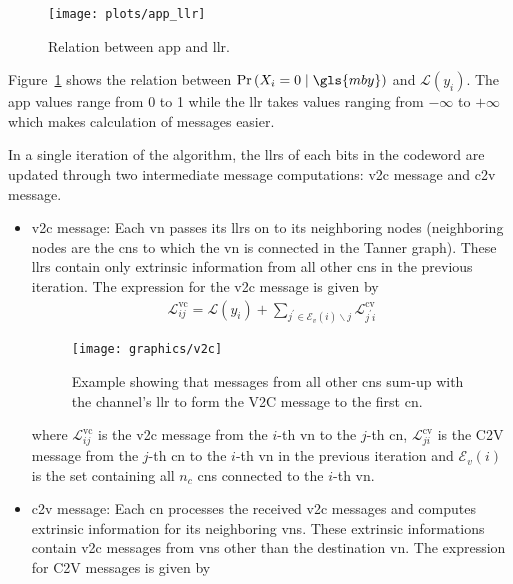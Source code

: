 \begin{figure}[htbp]
  \centering
  \texttt{[image: plots/app\_llr]}
  \caption{Relation between \gls{app} and \gls{llr}.}
  \label{fig:app_llr}
\end{figure}

Figure~\ref{fig:app_llr} shows the relation between $\prob\left(X_i=0\mid\gls{mby}\right)$ and $\mathcal{L}(y_i)$. The \gls{app} values range from 0 to 1 while the \gls{llr} takes values ranging from $-\infty$ to $+\infty$ which makes calculation of messages easier.

In a single iteration of the algorithm, the \glspl{llr} of each bits in the codeword are updated through two intermediate message computations: \gls{v2c} message and \gls{c2v} message.
\begin{itemize}
  \item \gls{v2c} message: Each \gls{vn} passes its \glspl{llr} on to its neighboring nodes (neighboring nodes are the \glspl{cn} to which the \gls{vn} is connected in the Tanner graph). These \glspl{llr} contain only extrinsic information from all other \glspl{cn} in the previous iteration. The expression for the \gls{v2c} message is given by~\cite{Hagenauer1996}
  \begin{align}
    \mathcal{L}^{\mathrm{vc}}_{ij}=\mathcal{L}(y_i)+\sum_{j^\prime\in\mathcal{E}_v(i)\backslash j} \mathcal{L}^{\mathrm{cv}}_{j^\prime i}
  \end{align}
  \begin{figure}[htbp]
    \centering
    \texttt{[image: graphics/v2c]}
    \caption{Example showing that messages from all other \glspl{cn} sum-up with the channel's \gls{llr} to form the V2C message to the first \gls{cn}.}
    \label{fig:v2c}
  \end{figure}
  where $\mathcal{L}^{\mathrm{vc}}_{ij}$ is the \gls{v2c} message from the $i$-th \gls{vn} to the $j$-th \gls{cn}, $\mathcal{L}^{\mathrm{cv}}_{ji}$ is the C2V message from the $j$-th \gls{cn} to the $i$-th \gls{vn} in the previous iteration and $\mathcal{E}_v(i)$ is the set containing  all $n_c$ \glspl{cn} connected to the $i$-th \gls{vn}.
  \item \gls{c2v} message: Each \gls{cn} processes the received \gls{v2c} messages and computes extrinsic information for its neighboring \glspl{vn}. These extrinsic informations contain \gls{v2c} messages from \glspl{vn} other than the destination \gls{vn}. The expression for C2V messages is given by~\cite{Hagenauer1996}

\end{itemize}
